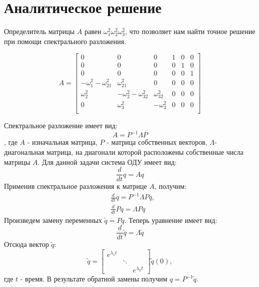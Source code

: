 \section{Аналитическое решение}

Определитель матрицы $A$ равен $\omega_1^2 \omega_2^2 \omega_3^2$, что позволяет нам найти точное решение при помощи спектрального разложения.

\begin{equation}
	A=
	\begin{bmatrix}
		0 & 0 & 0 & 1 & 0 & 0 \\
		0 & 0 & 0 & 0 & 1 & 0 \\
		0 & 0 & 0 & 0 & 0 & 1 \\
		-\omega_1^2 - \omega_{21}^2 & \omega_{21}^2 & 0 & 0 & 0 & 0 \\
		\omega_2^2 & -\omega_{2}^2 - \omega_{32}^2 & \omega_{32}^2 & 0 & 0 & 0 \\
		0 & \omega_{3}^2 & -\omega_{3}^2 & 0 & 0 & 0 \\
	\end{bmatrix}	
\end{equation}

	Спектральное разложение имеет вид:
\begin{equation}
A = P^{-1} \Lambda P
\end{equation}
, где $A$ - изначальная матрица, $P$ - матрица собственных векторов, $\Lambda$- диагональная матрица, на диагонали которой расположены собственные числа матрицы $A$.
	Для данной задачи система ОДУ имеет вид: 
\begin{equation}
	\frac{d}{dt}q = A q
\end{equation}
	Применив спектральное разложения к матрице $A$, получим:
\begin{align}
	&\frac{d}{dt}q =  P^{-1} \Lambda P q,\\ 
	&\frac{d}{dt} P q =  \Lambda P q
\end{align}
	Произведем замену переменных $\tilde{q} = P q$. Теперь уравнение имеет вид:
\begin{equation}
	\frac{d}{dt}\tilde{q} = \Lambda \tilde{q}
\end{equation}
	Отсюда вектор $\tilde{q}$:
\begin{equation}\label{eq:q}
\tilde{q} = 
\begin{bmatrix}
 e^{\lambda_1 t} & & \\
    & \ddots & \\
    & & e^{\lambda_n t}
\end{bmatrix} \tilde{q}(0) ,
\end{equation}	
 где $t$ - время. В результате обратной замены получим $q = P^{-1} \tilde{q}$.

